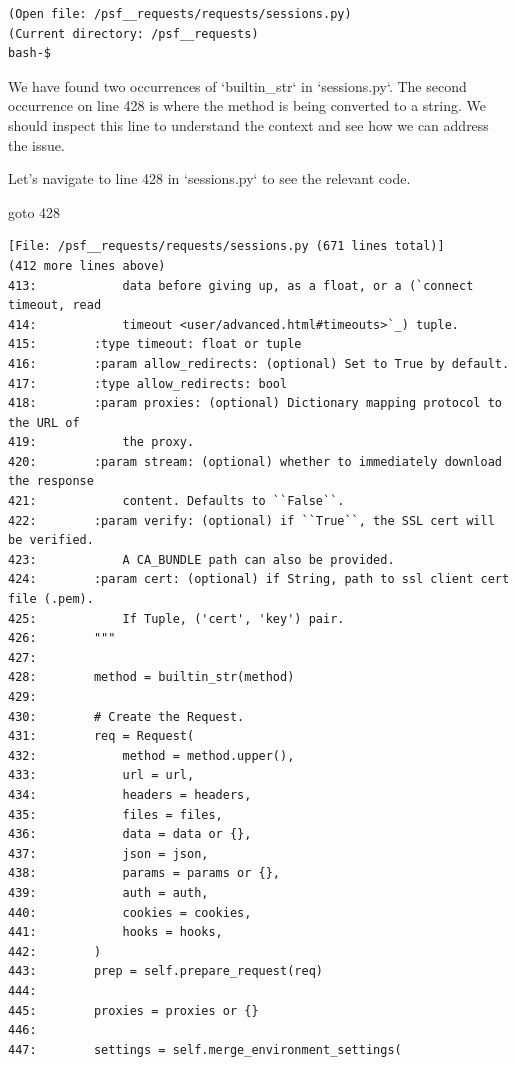 {\begin{observationbox}
\begin{Verbatim}[breaklines=true, breakanywhere=true]
(Open file: /psf__requests/requests/sessions.py)
(Current directory: /psf__requests)
bash-$
\end{Verbatim}
\end{observationbox}
\begin{agentbox}
We have found two occurrences of `builtin\_str` in `sessions.py`. The second occurrence on line 428 is where the method is being converted to a string. We should inspect this line to understand the context and see how we can address the issue.



Let's navigate to line 428 in `sessions.py` to see the relevant code.

\hrulefill
\begin{CodeVerbatim}[breaklines=true, breakanywhere=true]
goto 428
\end{CodeVerbatim}
\end{agentbox}
\begin{observationbox}\begin{Verbatim}[breaklines=true, breakanywhere=true]
[File: /psf__requests/requests/sessions.py (671 lines total)]
(412 more lines above)
413:            data before giving up, as a float, or a (`connect timeout, read
414:            timeout <user/advanced.html#timeouts>`_) tuple.
415:        :type timeout: float or tuple
416:        :param allow_redirects: (optional) Set to True by default.
417:        :type allow_redirects: bool
418:        :param proxies: (optional) Dictionary mapping protocol to the URL of
419:            the proxy.
420:        :param stream: (optional) whether to immediately download the response
421:            content. Defaults to ``False``.
422:        :param verify: (optional) if ``True``, the SSL cert will be verified.
423:            A CA_BUNDLE path can also be provided.
424:        :param cert: (optional) if String, path to ssl client cert file (.pem).
425:            If Tuple, ('cert', 'key') pair.
426:        """
427:
428:        method = builtin_str(method)
429:
430:        # Create the Request.
431:        req = Request(
432:            method = method.upper(),
433:            url = url,
434:            headers = headers,
435:            files = files,
436:            data = data or {},
437:            json = json,
438:            params = params or {},
439:            auth = auth,
440:            cookies = cookies,
441:            hooks = hooks,
442:        )
443:        prep = self.prepare_request(req)
444:
445:        proxies = proxies or {}
446:
447:        settings = self.merge_environment_settings(

\end{Verbatim}
\end{observationbox}}

